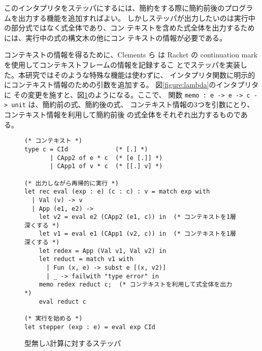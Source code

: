 このインタプリタをステッパにするには、簡約をする際に簡約前後のプログラ
ムを出力する機能を追加すればよい。
しかしステッパが出力したいのは実行中の部分式ではなく式全体であり、コン
テキストを含めた式全体を出力するためには、実行中の式の構文木の他にコン
テキストの情報が必要である。


コンテキストの情報を得るために、Clements ら\cite{clements01} は Racket
の continuation mark を使用してコンテキストフレームの情報を記録するこ
とでステッパを実装した。本研究ではそのような特殊な機能は使わずに、
インタプリタ関数に明示的にコンテキスト情報のための引数を追加する。
図\ref{figure:lambda}のインタプリタに
その変更を施すと、図\ref{figure:lambda_stepper}のようになる。ここで、
関数 \texttt{memo :\ e -> e -> c -> unit} は、簡約前の式、簡約後の式、
コンテキスト情報の3つを引数にとり、コンテキスト情報を利用して簡約前後
の式全体をそれぞれ出力するものである。


\begin{figure}
\begin{verbatim}
(* コンテキスト *)
type c = CId             (* [.] *)
       | CApp2 of e * c  (* [e [.]] *)
       | CApp1 of v * c  (* [[.] v] *)

(* 出力しながら再帰的に実行 *)
let rec eval (exp : e) (c : c) : v = match exp with
  | Val (v) -> v
  | App (e1, e2) ->
    let v2 = eval e2 (CApp2 (e1, c)) in  (* コンテキストを1層深くする *)
    let v1 = eval e1 (CApp1 (v2, c)) in  (* コンテキストを1層深くする *)
    let redex = App (Val v1, Val v2) in
    let reduct = match v1 with
      | Fun (x, e) -> subst e [(x, v2)]
      | _ -> failwith "type error" in
    memo redex reduct c;  (* コンテキストを利用して式全体を出力 *)
    eval reduct c

(* 実行を始める *)
let stepper (exp : e) = eval exp CId
\end{verbatim}
\caption{型無し$\lambda$計算に対するステッパ}
\label{figure:lambda_stepper}
\end{figure}

